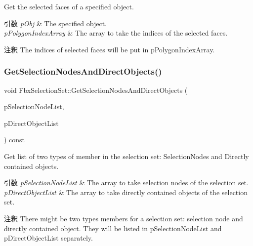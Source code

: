 Get the selected faces of a specified object. 
\begin{DoxyParams}{引数}
{\em p\+Obj} & The specified object. \\
\hline
{\em p\+Polygon\+Index\+Array} & The array to take the indices of the selected faces. \\
\hline
\end{DoxyParams}
\begin{DoxyRemark}{注釈}
The indices of selected faces will be put in p\+Polygon\+Index\+Array. 
\end{DoxyRemark}
\mbox{\label{class_fbx_selection_set_af0b2e85e61badfce8f700df48a8c0e50}} 
\subsubsection{\texorpdfstring{Get\+Selection\+Nodes\+And\+Direct\+Objects()}{GetSelectionNodesAndDirectObjects()}}
{\footnotesize\ttfamily void Fbx\+Selection\+Set\+::\+Get\+Selection\+Nodes\+And\+Direct\+Objects (\begin{DoxyParamCaption}\item[{\hyperlink{class_fbx_array}{Fbx\+Array}$<$ \hyperlink{class_fbx_selection_node}{Fbx\+Selection\+Node} $\ast$$>$ \&}]{p\+Selection\+Node\+List,  }\item[{\hyperlink{class_fbx_array}{Fbx\+Array}$<$ \hyperlink{class_fbx_object}{Fbx\+Object} $\ast$$>$ \&}]{p\+Direct\+Object\+List }\end{DoxyParamCaption}) const}

Get list of two types of member in the selection set\+: Selection\+Nodes and Directly contained objects. 
\begin{DoxyParams}{引数}
{\em p\+Selection\+Node\+List} & The array to take selection nodes of the selection set. \\
\hline
{\em p\+Direct\+Object\+List} & The array to take directly contained objects of the selection set. \\
\hline
\end{DoxyParams}
\begin{DoxyRemark}{注釈}
There might be two types members for a selection set\+: selection node and directly contained object. They will be listed in p\+Selection\+Node\+List and p\+Direct\+Object\+List separately. 
\end{DoxyRemark}
\mbox{\label{class_fbx_selection_set_a4ec4d2f7e801768d621430636e849101}} 
